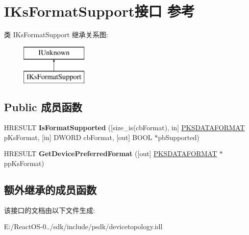\hypertarget{interface_i_ks_format_support}{}\section{I\+Ks\+Format\+Support接口 参考}
\label{interface_i_ks_format_support}
类 I\+Ks\+Format\+Support 继承关系图\+:\begin{figure}[H]
\begin{center}
\leavevmode
\includegraphics[height=2.000000cm]{interface_i_ks_format_support}
\end{center}
\end{figure}
\subsection*{Public 成员函数}
\begin{DoxyCompactItemize}
\item 
\mbox{\label{interface_i_ks_format_support_a45b4fb629beef9c2fc13cdcd4cf44c93}} 
H\+R\+E\+S\+U\+LT {\bfseries Is\+Format\+Supported} (\mbox{[}size\+\_\+is(cb\+Format), in\mbox{]} \hyperlink{struct_k_s_d_a_t_a_f_o_r_m_a_t}{P\+K\+S\+D\+A\+T\+A\+F\+O\+R\+M\+AT} p\+Ks\+Format, \mbox{[}in\mbox{]} D\+W\+O\+RD cb\+Format, \mbox{[}out\mbox{]} B\+O\+OL $\ast$pb\+Supported)
\item 
\mbox{\label{interface_i_ks_format_support_a13986b95bbb66e47b6759346fd0ed259}} 
H\+R\+E\+S\+U\+LT {\bfseries Get\+Device\+Preferred\+Format} (\mbox{[}out\mbox{]} \hyperlink{struct_k_s_d_a_t_a_f_o_r_m_a_t}{P\+K\+S\+D\+A\+T\+A\+F\+O\+R\+M\+AT} $\ast$pp\+Ks\+Format)
\end{DoxyCompactItemize}
\subsection*{额外继承的成员函数}


该接口的文档由以下文件生成\+:\begin{DoxyCompactItemize}
\item 
E\+:/\+React\+O\+S-\/0../sdk/include/psdk/devicetopology.\+idl\end{DoxyCompactItemize}
